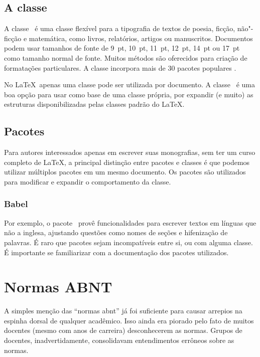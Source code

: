 \subsection{A classe \memoir}

A classe \memoir\ é uma classe flexível para a tipografia de textos de poesia, ficção, não"-ficção e matemática, como livros, relatórios, artigos ou manuscritos. Documentos podem usar tamanhos de fonte de 9~pt, 10~pt, 11~pt, 12~pt, 14~pt ou 17~pt como tamanho normal de fonte. Muitos métodos são oferecidos para criação de formatações particulares. A classe incorpora mais de 30 pacotes populares \cite{memoir2001}.

No \LaTeX\, apenas uma classe pode ser utilizada por documento. A classe \memoir\ é uma boa opção para usar como base de uma classe própria, por expandir (e muito) as estruturas disponibilizadas pelas classes padrão do \LaTeX.

\subsection{Pacotes}

Para autores interessados apenas em escrever suas monografias, sem ter um curso completo de \LaTeX, a principal distinção entre pacotes e classes é que podemos utilizar múltiplos pacotes em um mesmo documento. Os pacotes são utilizados para modificar e expandir o comportamento da classe.

\subsubsection{Babel}

Por exemplo, o pacote \babel\ provê funcionalidades para escrever textos em línguas que não a inglesa, ajustando questões como nomes de seções e hifenização de palavras. É raro que pacotes sejam incompatíveis entre si, ou com alguma classe. É importante se familiarizar com a documentação dos pacotes utilizados.

\section{Normas ABNT}

A simples menção das \enquote{normas \ac{abnt}} já foi suficiente para causar arrepios na espinha dorsal de qualquer acadêmico. Isso ainda era piorado pelo fato de muitos docentes (mesmo com anos de carreira) desconhecerem as normas. Grupos de docentes, inadvertidamente, consolidavam entendimentos errôneos sobre as normas.

